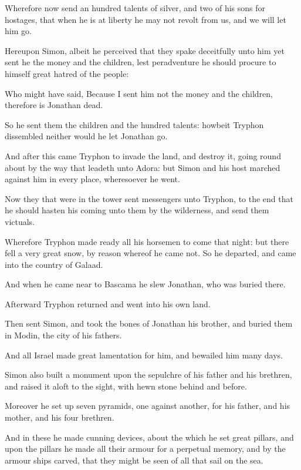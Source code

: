 {\par }{\PP {}Wherefore now send an hundred talents of silver, and two of his sons for hostages, that when he is at liberty he may not revolt from us, and we will let him go.
\par }{\PP {}Hereupon Simon, albeit he perceived that they spake deceitfully unto him yet sent he the money and the children, lest peradventure he should procure to himself great hatred of the people:
\par }{\PP {}Who might have said, Because I sent him not the money and the children, therefore is Jonathan dead.
\par }{\PP {}So he sent them the children and the hundred talents: howbeit Tryphon dissembled neither would he let Jonathan go.
\par }{\PP {}And after this came Tryphon to invade the land, and destroy it, going round about by the way that leadeth unto Adora: but Simon and his host marched against him in every place, wheresoever he went.
\par }{\PP {}Now they that were in the tower sent messengers unto Tryphon, to the end that he should hasten his coming unto them by the wilderness, and send them victuals.
\par }{\PP {}Wherefore Tryphon made ready all his horsemen to come that night: but there fell a very great snow, by reason whereof he came not. So he departed, and came into the country of Galaad.
\par }{\PP {}And when he came near to Bascama he slew Jonathan, who was buried there.
\par }{\PP {}Afterward Tryphon returned and went into his own land.
\par }{\PP {}Then sent Simon, and took the bones of Jonathan his brother, and buried them in Modin, the city of his fathers.
\par }{\PP {}And all Israel made great lamentation for him, and bewailed him many days.
\par }{\PP {}Simon also built a monument upon the sepulchre of his father and his brethren, and raised it aloft to the sight, with hewn stone behind and before.
\par }{\PP {}Moreover he set up seven pyramids, one against another, for his father, and his mother, and his four brethren.
\par }{\PP {}And in these he made cunning devices, about the which he set great pillars, and upon the pillars he made all their armour for a perpetual memory, and by the armour ships carved, that they might be seen of all that sail on the sea.
}
